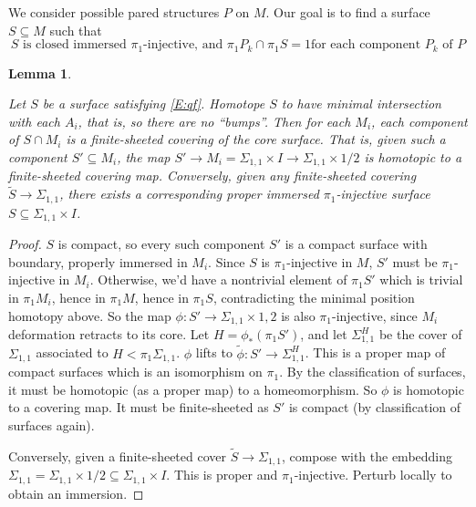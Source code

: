 \documentclass[12pt]{amsart}
\newtheorem{lemma}[theorem]{Lemma}
\theoremstyle{definition}
\theoremstyle{remark}
\newcommand{\x}{\times}
\newcommand{\Si}{\Sigma}
\newcommand{\cin}{\subseteq}
\begin{document}
We consider possible pared structures $P$ on $M$. Our goal is to find
a surface $S \cin M$ such that
\begin{equation}\label{E:qf}
S \text{ is closed immersed $\pi_1$-injective, and  $\pi_1P_k \cap \pi_1S
= 1$
for each component $P_k$ of $P$} \tag{\textasteriskcentered}
\end{equation}


\begin{lemma}\label{L:sc}

Let $S$ be a surface satisfying \eqref{E:qf}. Homotope $S$ to have minimal
intersection with each $A_i$, that is, so there are no ``bumps''.  Then for
each $M_i$, each component of $S \cap M_i$ is a finite-sheeted covering of the
core surface.  That is, given such a component $S' \cin M_i$, the map $S' \to
M_i = \Si_{1,1}\x I \to \Si_{1,1}\x{1/2}$ is homotopic to a finite-sheeted
covering map. Conversely, given any finite-sheeted covering $\widetilde{S} \to
\Si_{1,1}$, there exists a corresponding proper immersed $\pi_1$-injective
surface $S \cin \Si_{1,1}\x I$.

\end{lemma}
\begin{proof}

$S$ is compact, so every such component $S'$ is a compact surface with
boundary, properly immersed in $M_i$. Since $S$ is $\pi_1$-injective in $M$,
$S'$ must be $\pi_1$-injective in $M_i$. Otherwise, we'd have a nontrivial
element of $\pi_1S'$ which is trivial in $\pi_1M_i$, hence in $\pi_1M$, hence
in $\pi_1S$, contradicting the minimal position homotopy above. So the map
$\phi : S'\to\Si_{1,1}\x{1,2}$ is also $\pi_1$-injective, since $M_i$
deformation retracts to its core. Let $H = \phi_*(\pi_1S')$, and let
$\Si_{1,1}^H$ be the cover of $\Si_{1,1}$ associated to $H<\pi_1\Si_{1,1}$.
$\phi$ lifts to $\widetilde{\phi}\colon S'\to \Si_{1,1}^H$. This is a proper
map of compact surfaces which is an isomorphism on $\pi_1$.  By the
classification of surfaces, it must be homotopic (as a proper map) to
a homeomorphism. So $\phi$ is homotopic to a covering map. It must be
finite-sheeted as $S'$ is compact (by classification of surfaces again).

Conversely, given a finite-sheeted cover $\widetilde{S}\to \Si_{1,1}$, compose
with the embedding $\Si_{1,1} = \Si_{1,1}\x{1/2} \cin \Si_{1,1}\x I$. This is
proper and $\pi_1$-injective.  Perturb locally to obtain an immersion.

\end{proof}
\end{document}
